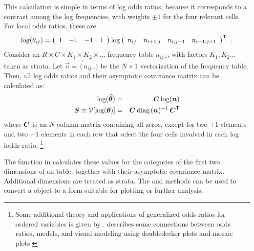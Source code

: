 \documentclass[10pt,krantz2]{krantz}\usepackage[]{graphicx}\usepackage[]{color}
\begin{document}
This calculation is simple in terms of log odds ratios, because it corresponds to a contrast among the log frequencies,
with weights $\pm 1$ for the four relevant cells. For local odds ratios, these are
\begin{equation*}
 \log( \theta_{ij}) = 
  \left(\begin{array}{rrrr}
  1  & -1 &  -1 & 1
  \end{array}
  \right)
  \log
	\left(\begin{array}{rrrr}
  n_{ij}  & n_{i+1, j} &  n_{i,j+1} & n_{i+1, j+1}
  \end{array}
  \right)^\mathsf{T} \:\: .
\end{equation*}
Consider an $R \times C \times K_1 \times K_2 \times \dots$ frequency table $n_{ij\cdots}$, with factors
$K_1, K_2 \dots$  taken as strata. Let $\vec{n} = \Vec({n_{ij\cdots}})$ be the $N\times 1$ vectorization
of the frequency table. Then, all log odds ratios and their asymptotic covariance matrix can be calculated as:
\begin{eqnarray*}
\log (\widehat{\bm{\theta}}) & = & \bm{C} \log(\bm{n}) \\
\bm{S}  \equiv  \mathcal{V} [\log (\bm{\theta})] & = & \bm{C} \: \mathrm{diag}\, (\bm{n})^{-1} \: \bm{C}^\mathsf{T}
\end{eqnarray*}
where $\bm{C}$ is an $N$-column matrix containing all zeros, except for 
two $+1$ elements and two $-1$ elements in each row that select the four cells involved in each log lodds ratio.%
\footnote{Some additional theory and applications of generalized odds ratios for ordered variables is given by \citet{Goodman:83}.
\citet{Hofmann:2001} describes some connections between odds ratios, \loglin models, and visual modeling using
doubledecker plots and mosaic plots.
}

The function  in  calculates these values for the categories of the first two
dimensions of an \nway table, together with their asymptotic covariance matrix. Additional dimensions are treated as strata.
The  and  methods can be used to convert a 
 object to a form suitable for plotting or further analysis.
\end{document}
